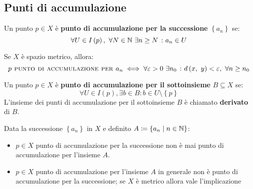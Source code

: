 \subsection{Punti di accumulazione}
\begin{define}
	Un punto $p\in X$ è \textbf{punto di accumulazione per la successione} $\left\{a_n\right\}$ se:
	\begin{equation}
		\forall U\in I\left(p\right),\ \forall N\in\mathbb{N}\ \exists n\geq N\ \colon a_n\in U
	\end{equation}
\vspace{-8mm}
\end{define}
\begin{exercise}
	Se $X$ è spazio metrico, allora:
	\begin{equation}
		p\textsc{ punto di accumulazione per } a_n\iff \forall \epsilon>0\ \exists n_0\ \colon \mvf{d}{x}{y}<\epsilon,\ \forall n\geq n_0
	\end{equation}
\end{exercise}
\vspace{-8mm}
\begin{define}
	Un punto $p\in X$ è \textbf{punto di accumulazione per il sottoinsieme} $B\subseteq X$ se:
	\begin{equation}
		\forall U\in I\left(p\right), \exists b\in B \colon b\in U\setminus \left\{ p\right\}
	\end{equation}
L'insieme dei punti di accumulazione per il sottoinsieme $B$ è chiamato \textbf{derivato} di $B$.
\end{define}
\begin{exercise}
Data la successione $\left\{a_n\right\}$ in $X$ e definito $A\coloneqq \{a_n\mid n\in\mathbb{N}\}$:
\begin{itemize}
\item $p\in X$ punto di accumulazione per la successione non è mai punto di accumulazione per l'insieme $A$.
\item $p\in X$ punto di accumulazione per l'insieme $A$ in generale non è punto di accumulazione per la successione; se $X$ è metrico %
allora vale l'implicazione
\end{itemize}
\end{exercise}
